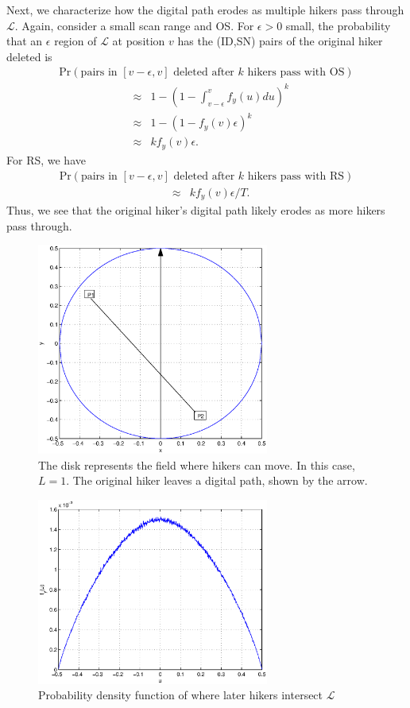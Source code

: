 \documentclass[conference]{IEEEtran}
\begin{document}
Next, we characterize how the digital path erodes as multiple hikers pass through $\mathcal{L}$.  Again, consider a small scan range and OS.  For $\epsilon > 0$ small, the probability that an $\epsilon$ region of $\mathcal{L}$ at position $v$ has the (ID,SN) pairs of the original hiker deleted is
\begin{eqnarray}
\mbox{Pr} \left( \mbox{pairs in $\left[v-\epsilon, v\right]$ deleted after $k$ hikers pass with OS} \right) \nonumber
\end{eqnarray}
\begin{eqnarray}
& \approx & 1 - \left( 1 - \int_{v-\epsilon}^v f_y\left(u\right) du \right)^k \\
&  \approx & 1 - \left(1 - f_y\left(v\right) \epsilon\right)^k \\
& \approx & k f_y\left(v\right) \epsilon.
\end{eqnarray}
For RS, we have 
\begin{eqnarray}
\mbox{Pr} \left( \mbox{pairs in $\left[v-\epsilon, v\right]$ deleted after $k$ hikers pass with RS} \right) \nonumber
\end{eqnarray}
\begin{eqnarray}
& \approx & k f_y\left(v\right) \epsilon / T.
\end{eqnarray}
Thus, we see that the original hiker's digital path likely erodes as more hikers pass through.
\begin{figure}
\centering
\includegraphics[width=3in]{circle.eps}
\caption{The disk represents the field where hikers can move.  In this case, $L = 1$.  The original hiker leaves a digital path, shown by the arrow.\label{fig:circle}}
\end{figure}

\begin{figure}
\centering
\includegraphics[width=3in]{pdf.eps}
\caption{Probability density function of where later hikers intersect $\mathcal{L}$  \label{fig:pdf}}
\end{figure}
\end{document}
